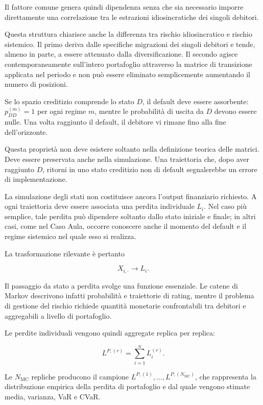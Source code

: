 Il fattore comune genera quindi dipendenza senza che sia necessario imporre
direttamente una correlazione tra le estrazioni idiosincratiche dei singoli
debitori.

Questa struttura chiarisce anche la differenza tra rischio idiosincratico e
rischio sistemico. Il primo deriva dalle specifiche migrazioni dei singoli
debitori e tende, almeno in parte, a essere attenuato dalla diversificazione.
Il secondo agisce contemporaneamente sull'intero portafoglio attraverso la
matrice di transizione applicata nel periodo e non pu\`o essere eliminato
semplicemente aumentando il numero di posizioni.

Se lo spazio creditizio comprende lo stato $D$, il default deve essere
assorbente: $p_{DD}^{(m)}=1$ per ogni regime $m$, mentre le probabilit\`a di
uscita da $D$ devono essere nulle. Una volta raggiunto il default, il debitore
vi rimane fino alla fine dell'orizzonte.

Questa propriet\`a non deve esistere soltanto nella definizione teorica delle
matrici. Deve essere preservata anche nella simulazione. Una traiettoria che,
dopo aver raggiunto $D$, ritorni in uno stato creditizio non di default
segnalerebbe un errore di implementazione.

La simulazione degli stati non costituisce ancora l'output finanziario
richiesto. A ogni traiettoria deve essere associata una perdita individuale
$L_i$. Nel caso pi\`u semplice, tale perdita pu\`o dipendere soltanto dallo
stato iniziale e finale; in altri casi, come nel Caso Aula, occorre conoscere
anche il momento del default e il regime sistemico nel quale esso si
realizza.

La trasformazione rilevante \`e pertanto

\[
X_{i,\cdot}
\longrightarrow
L_i.
\]

Il passaggio da stato a perdita svolge una funzione essenziale. Le catene di
Markov descrivono infatti probabilit\`a e traiettorie di rating, mentre il
problema di gestione del rischio richiede quantit\`a monetarie confrontabili
tra debitori e aggregabili a livello di portafoglio.

Le perdite individuali vengono quindi aggregate replica per replica:

\[
L^{P,(r)}
=
\sum_{i=1}^{n}L_i^{(r)}.
\]

Le $N_{\mathrm{MC}}$ repliche producono il campione
$L^{P,(1)},\ldots,L^{P,(N_{\mathrm{MC}})}$, che rappresenta la distribuzione
empirica della perdita di portafoglio e dal quale vengono stimate media,
varianza, VaR e CVaR.

